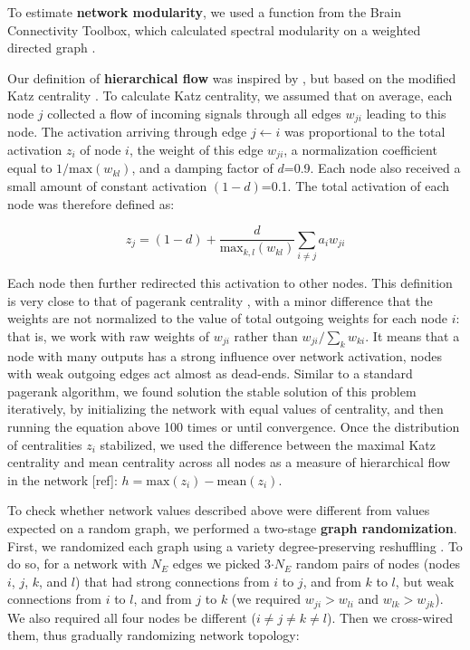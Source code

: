 \documentclass{article}
\begin{document}
To estimate \textbf{network modularity}, we used a function from the Brain Connectivity Toolbox, which calculated spectral modularity on a weighted directed graph \citep{reichardt2006community,leicht2008community}.

Our definition of \textbf{hierarchical flow} was inspired by \citep{mones2012hierarchy,czegel2015hierarchy}, but based on the modified Katz centrality \citep{katz1953original,fletcher2018katz}. To calculate Katz centrality, we assumed that on average, each node $j$ collected a flow of incoming signals through all edges $w_{ji}$ leading to this node. The activation arriving through edge $j\leftarrow i$ was proportional to the total activation $z_i$ of node $i$, the weight of this edge $w_{ji}$, a normalization coefficient equal to $1/\text{max}(w_{kl})$, and a damping factor of $d$=0.9. Each node also received a small amount of constant activation $(1-d)$=0.1. The total activation of each node was therefore defined as:

\[ z_j = (1-d) + \frac{d}{\text{max}_{k,l}(w_{kl})} \sum_{i \neq j}{a_i w_{ji}} \]

Each node then further redirected this activation to other nodes. This definition is very close to that of pagerank centrality \citep{page1999pagerank}, with a minor difference that the weights are not normalized to the value of total outgoing weights for each node $i$: that is, we work with raw weights of $w_{ji}$ rather than $w_{ji}/\sum_k{w_{ki}}$. It means that a node with many outputs has a strong influence over network activation, nodes with weak outgoing edges act almost as dead-ends. Similar to a standard pagerank algorithm, we found solution the stable solution of this problem iteratively, by initializing the network with equal values of centrality, and then running the equation above 100 times or until convergence. Once the distribution of centralities $z_i$ stabilized, we used the difference between the maximal Katz centrality and mean centrality across all nodes as a measure of hierarchical flow in the network [ref]: $h = \text{max}(z_i) - \text{mean}(z_i)$.

To check whether network values described above were different from values expected on a random graph, we performed a two-stage \textbf{graph randomization}. First, we randomized each graph using a variety degree-preserving reshuffling \citep{maslov2002}. To do so, for a network with $N_E$ edges we picked 3$\cdot N_E$ random pairs of nodes (nodes $i$, $j$, $k$, and $l$) that had strong connections from $i$ to $j$, and from $k$ to $l$, but weak connections from $i$ to $l$, and from $j$ to $k$ (we required $w_{ji}>w_{li}$ and $w_{lk}>w_{jk}$). We also required all four nodes be different ($i \neq j \neq k \neq l$). Then we cross-wired them, thus gradually randomizing network topology:
\end{document}
